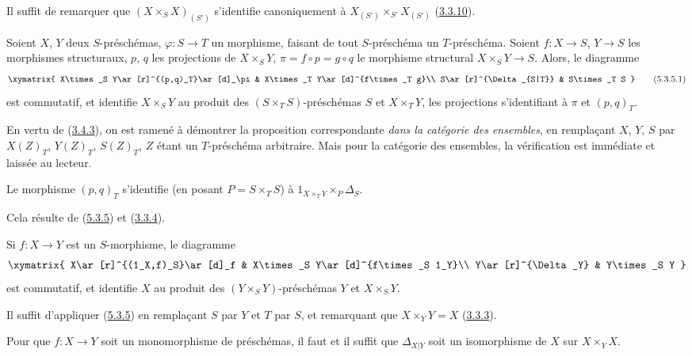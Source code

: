 Il suffit de remarquer que $(X\times_S X)_{(S')}$ s'identifie canoniquement à
$X_{(S')}\times_{S'}X_{(S')}$
(\hyperref[I.3.3.10-fr]{3.3.10}).

\begin{proposition}[5.3.5]
\label{I.5.3.5-fr}
Soient $X$, $Y$ deux $S$-préschémas, $\varphi:S\to T$ un morphisme, faisant de
tout $S$-préschéma un $T$-préschéma. Soient $f:X\to S$, $Y\to S$ les
morphismes structuraux, $p$, $q$ les projections de $X\times_S Y$,
$\pi=f\circ p=g\circ q$ le morphisme structural $X\times_S Y\to S$. Alors, le
diagramme
\[
  \xymatrix{
    X\times_S Y\ar[r]^{(p,q)_T}\ar[d]_\pi &
    X\times_T Y\ar[d]^{f\times_T g}\\
    S\ar[r]^{\Delta_{S|T}} &
    S\times_T S
  }
  \tag{5.3.5.1}\label{I.5.3.5.1-fr}
\]
est commutatif, et identifie $X\times_S Y$ au produit des
$(S\times_T S)$-préschémas $S$ et $X\times_T Y$, les projections
s'identifiant à $\pi$ et $(p,q)_T$.
\end{proposition}

En vertu de (\hyperref[I.3.4.3-fr]{3.4.3}), on est ramené à démontrer la
proposition correspondante \emph{dans la catégorie des ensembles}, en
remplaçant $X$, $Y$, $S$ par $X(Z)_T$, $Y(Z)_T$, $S(Z)_T$, $Z$ étant un
$T$-préschéma arbitraire. Mais pour la catégorie des ensembles, la vérification
est immédiate et laissée au lecteur.

\begin{corollary}[5.3.6]
\label{I.5.3.6-fr}
Le morphisme $(p,q)_T$ s'identifie (en posant $P=S\times_T S$) à
$1_{X\times_T Y}\times_P\Delta_S$.
\end{corollary}

Cela résulte de (\hyperref[I.5.3.5-fr]{5.3.5}) et
(\hyperref[I.3.3.4-fr]{3.3.4}).

\begin{corollary}[5.3.7]
\label{I.5.3.7-fr}
Si $f:X\to Y$ est un $S$-morphisme, le diagramme
\[
  \xymatrix{
    X\ar[r]^{(1_X,f)_S}\ar[d]_f &
    X\times_S Y\ar[d]^{f\times_S 1_Y}\\
    Y\ar[r]^{\Delta_Y} &
    Y\times_S Y
  }
\]
est commutatif, et identifie $X$ au produit des
$(Y\times_S Y)$-préschémas $Y$ et $X\times_S Y$.
\end{corollary}

Il suffit d'appliquer (\hyperref[I.5.3.5-fr]{5.3.5}) en remplaçant $S$ par
$Y$ et $T$ par $S$, et remarquant que $X\times_Y Y=X$
(\hyperref[I.3.3.3-fr]{3.3.3}).

\begin{proposition}[5.3.8]
\label{I.5.3.8-fr}
Pour que $f:X\to Y$ soit un monomorphisme de préschémas, il faut et il suffit
que $\Delta_{X|Y}$ soit un isomorphisme de $X$ sur $X\times_Y X$.
\end{proposition}

